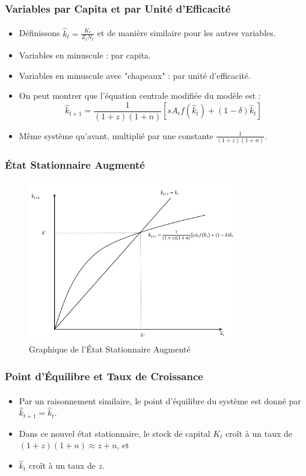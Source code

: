 \documentclass{beamer}
\begin{document}
\begin{frame}
    \frametitle{Variables par Capita et par Unité d'Efficacité}
    \framesubtitle{}

    \begin{itemize}
        \item Définissons \( \hat{k}_t = \frac{K_t}{Z_t N_t} \) et de manière similaire pour les autres variables.
        \pause
        \item Variables en minuscule : par capita.\pause
        \item Variables en minuscule avec "chapeaux" : par unité d'efficacité.\pause
        \item On peut montrer que l'équation centrale modifiée du modèle est :
        \[
        \hat{k}_{t+1} = \frac{1}{(1 + z)(1 + n)} \left[ s A_t f(\hat{k}_t) + (1 - \delta) \hat{k}_t \right]
        \]
        \item Même système qu'avant, multiplié par une constante \( \frac{1}{(1 + z)(1 + n)} \).
    \end{itemize}
\end{frame}

\begin{frame}
    \frametitle{État Stationnaire Augmenté}
    \framesubtitle{}

    \begin{figure}
        \centering
        \includegraphics[width=0.8\textwidth]{graphs/ss_solow_s3.png} %
        \caption{Graphique de l'État Stationnaire Augmenté}
    \end{figure}
\end{frame}

\begin{frame}
    \frametitle{Point d'Équilibre et Taux de Croissance}
    \framesubtitle{}

    \begin{itemize}
        \item Par un raisonnement similaire, le point d'équilibre du système est donné par \( \hat{k}_{t+1} = \hat{k}_t \).
        \item Dans ce nouvel état stationnaire, le stock de capital \( K_t \) croît à un taux de \((1+z)(1+n) \approx z + n\), et
        \item \( \hat{k}_t \) croît à un taux de \( z \).
    \end{itemize}
\end{frame}
\end{document}
